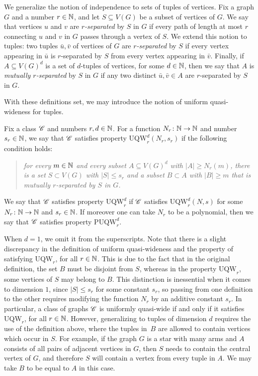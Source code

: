 We generalize the notion of independence to sets of tuples of
vertices.  Fix a graph $G$ and a number $r\in \mathbb{N}$, and let
$S\subseteq V(G)$ be a subset of vertices of $G$.  We say that
vertices $u$ and $v$ are {\em{$r$-separated}} by $S$ in $G$ if every
path of length at most $r$ connecting $u$ and $v$ in $G$ passes
through a vertex of $S$.  We extend this notion to tuples: two tuples
$\bar u,\bar v$ of vertices of $G$ are \emph{$r$-separated} by $S$ if
every vertex appearing in $\bar u$ is $r$-separated by $S$ from every
vertex appearing in $\bar{v}$.  Finally, if $A\subseteq V(G)^d$ is a
set of $d$-tuples of vertices, for some $d\in\mathbb{N}$, then we say that $A$
is \emph{mutually $r$-separated} by $S$ in $G$ if any two distinct
$\bar u,\bar v\in A$ are $r$-separated by $S$ in $G$.

\newcommand{\uqw}{\mathrm{UQW}}
\newcommand{\puqw}{\mathrm{PUQW}}
With these definitions set, we may introduce the notion of uniform quasi-wideness for tuples.

\begin{definition}
  Fix a class $\mathscr{C}$ and numbers $r,d\in\mathbb{N}$.  For a function
  $N_r\colon\mathbb{N}\to\mathbb{N}$ and number $s_r\in\mathbb{N}$, we say that $\mathscr{C}$
  satisfies property $\uqw^d_r(N_r,s_r)$ if the following condition
  holds:
   \begin{quote}\itshape 
     for every $m\in \mathbb{N}$ and every subset $A\subseteq V(G)^d$ with
     $|A|\ge N_r(m)$, there is a set $S\subset V(G)$ with $|S|\le s_r$
     and a subset $B\subset A$ with $|B|\ge m$ that is mutually
     $r$-separated by $S$ in $G$.
   \end{quote}   
   We say that $\mathscr{C}$ satisfies property $\uqw^d_r$ if $\mathscr{C}$
   satisfies $\uqw^d_r(N,s)$ for some $N_r\colon\mathbb{N}\to\mathbb{N}$ and
   $s_r\in\mathbb{N}$.  If moreover one can take $N_r$ to be a polynomial,
   then we say that $\mathscr{C}$ satisfies property $\puqw^d_r$.
\end{definition}

When $d=1$, we omit it from the superscripts.  Note that there is a
slight discrepancy in the definition of uniform quasi-wideness and the
property of satisfying $\uqw_r$, for all $r\in \mathbb{N}$.  This is due to
the fact that in the original definition, the set $B$ must be disjoint
from $S$, whereas in the property $\uqw_r$, some vertices of $S$ may
belong to $B$. This distinction is inessential when it comes to
dimension $1$, since $|S|\le s_r$ for some constant $s_r$, so passing
from one definition to the other requires modifying the function $N_r$
by an additive constant $s_r$.  In particular, a class of graphs
$\mathscr{C}$ is uniformly quasi-wide if and only if it satisfies $\uqw_r$,
for all $r\in \mathbb{N}$.  However, generalizing to tuples of dimension $d$
requires the use of the definition above, where the tuples in~$B$ are
allowed to contain vertices which occur in $S$.  For example, if the
graph $G$ is a star with many arms and $A$ consists of all pairs of
adjacent vertices in $G$, then $S$ needs to contain the central vertex
of $G$, and therefore $S$ will contain a vertex from every tuple in
$A$. We may take $B$ to be equal to $A$ in this case.
  
